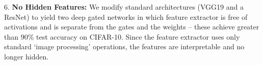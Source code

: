 \indent\quad$6.$ \textbf{No Hidden Features:} We modify standard architectures (VGG19 and a ResNet) to yield two deep gated networks in which feature extractor is free of activations and is separate from the gates and the weights -- these achieve greater than $90\%$ test accuracy on CIFAR-10. Since the feature extractor uses only standard `image processing' operations, the features are interpretable and no longer hidden.




